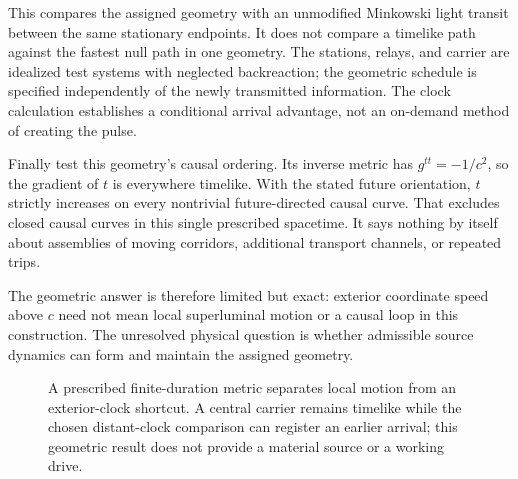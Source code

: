 \documentclass[11pt]{article}
\begin{document}
This compares the assigned geometry with an unmodified Minkowski light transit between the same stationary endpoints. It does not compare a timelike path against the fastest null path in one geometry. The stations, relays, and carrier are idealized test systems with neglected backreaction; the geometric schedule is specified independently of the newly transmitted information. The clock calculation establishes a conditional arrival advantage, not an on-demand method of creating the pulse.

Finally test this geometry's causal ordering. Its inverse metric has $g^{tt}=-1/c^2$, so the gradient of $t$ is everywhere timelike. With the stated future orientation, $t$ strictly increases on every nontrivial future-directed causal curve. That excludes closed causal curves in this single prescribed spacetime. It says nothing by itself about assemblies of moving corridors, additional transport channels, or repeated trips.

The geometric answer is therefore limited but exact: exterior coordinate speed above $c$ need not mean local superluminal motion or a causal loop in this construction. The unresolved physical question is whether admissible source dynamics can form and maintain the assigned geometry.

\begin{figure}[!htbp]
\centering
{}
\caption{A prescribed finite-duration metric separates local motion from an exterior-clock shortcut. A central carrier remains timelike while the chosen distant-clock comparison can register an earlier arrival; this geometric result does not provide a material source or a working drive.}
\par{}
\end{figure}
\end{document}

